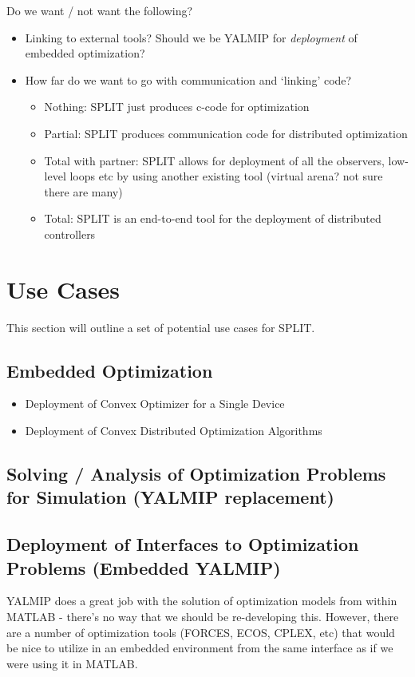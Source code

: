 \documentclass[11pt,a4paper]{article}
\begin{document}
Do we want / not want the following?
\begin{itemize}
  \item Linking to external tools? Should we be YALMIP for \emph{deployment} of embedded optimization?
  \item How far do we want to go with communication and `linking' code? 
  \begin{itemize}
    \item Nothing: SPLIT just produces c-code for optimization
    \item Partial: SPLIT produces communication code for distributed optimization
    \item Total with partner: SPLIT allows for deployment of all the observers, low-level loops etc by using another existing tool (virtual arena? not sure there are many)
    \item Total: SPLIT is an end-to-end tool for the deployment of distributed controllers
  \end{itemize}
\end{itemize}

\section{Use Cases}
This section will outline a set of potential use cases for SPLIT.

\subsection{Embedded Optimization}
\begin{itemize}
  \item Deployment of Convex Optimizer for a Single Device
  \item Deployment of Convex Distributed Optimization Algorithms
\end{itemize}

\subsection{Solving / Analysis of Optimization Problems for Simulation (YALMIP replacement)}

\subsection{Deployment of Interfaces to Optimization Problems (Embedded YALMIP)}
YALMIP does a great job with the solution of optimization models from within MATLAB - there's no way that we should be re-developing this. However, there are a number of optimization tools (FORCES, ECOS, CPLEX, etc) that would be nice to utilize in an embedded environment from the same interface as if we were using it in MATLAB.
\end{document}
